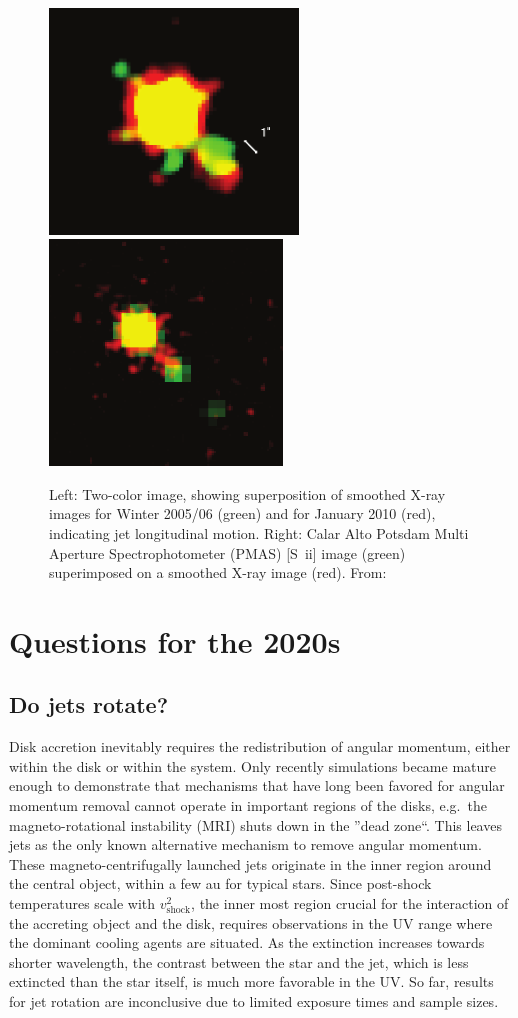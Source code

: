 \documentclass[12pt]{article}
\begin{document}
\begin{figure}[htb]
\centering
\includegraphics[height=6cm]{xjetmotion.png}
\includegraphics[height=6cm]{xjetmotion2.png}
\caption{Left: Two-color image, showing superposition of smoothed X-ray
images for Winter 2005/06 (green) and for January 2010 (red), indicating jet longitudinal motion. Right: Calar Alto Potsdam Multi Aperture Spectrophotometer (PMAS) [S~{\sc ii}] image (green) superimposed on a smoothed X-ray image (red). From:}
\label{fig:Xray}
\end{figure}

\section{Questions for the 2020s}

\subsection{Do jets rotate?}
Disk accretion inevitably requires the redistribution of angular momentum, either within the disk or within the system. Only recently simulations became mature enough to demonstrate that mechanisms that have long been favored for angular momentum removal cannot operate in important regions of the disks, e.g.\ the magneto-rotational instability (MRI) shuts down in the ''dead zone``. This  leaves jets as the only known alternative mechanism to remove angular momentum. These magneto-centrifugally launched jets originate in the inner region around the central object, within a few au for typical stars. Since post-shock temperatures scale with $v^2_\mathrm{shock}$, the inner most region crucial for the interaction of the accreting object and the disk, requires observations in the UV range where the dominant cooling agents are situated.
As the extinction increases towards shorter wavelength, the contrast between the star and the jet, which is less extincted than the star itself, is much more favorable in the UV. So far, results for jet rotation are inconclusive due to limited exposure times and sample sizes. 
\end{document}
